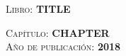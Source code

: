 
\newcommand{\libro}[4]{
\vspace*{10cm}
\textsc{Libro}: \uppercase{\textbf{#1}}\\
\bigskip

\textsc{Capítulo}: \uppercase{\textbf{#2}}\\

\textsc{Año de publicación}: \uppercase{\textbf{#3}}\\
\cleardoublepage

}

\libro{Title}{Chapter}{2018}{book}
